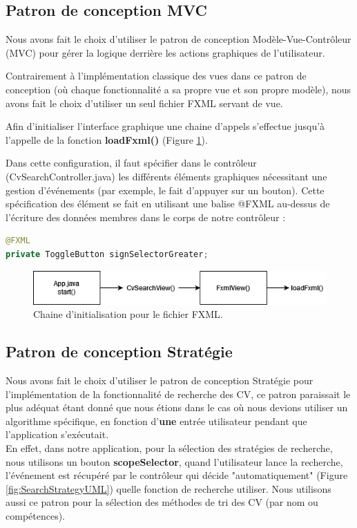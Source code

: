 \documentclass{article}
\begin{document}
\subsection{Patron de conception \textbf{MVC}}
Nous avons fait le choix d'utiliser le patron de conception Modèle-Vue-Contrôleur (MVC) pour gérer la logique derrière les actions graphiques de l'utilisateur.

Contrairement à l'implémentation classique des vues dans ce patron de conception (où chaque fonctionnalité a sa propre vue et son propre modèle), nous avons fait le choix d'utiliser un seul fichier FXML servant de vue.

Afin d'initialiser l'interface graphique une chaine d'appels s'effectue jusqu'à l'appelle de la fonction \textbf{loadFxml()} (Figure \ref{fig:loadFXML_chain}).

Dans cette configuration, il faut spécifier dans le contrôleur (CvSearchController.java) les différents éléments graphiques nécessitant une gestion d'événements (par exemple, le fait d'appuyer sur un bouton). Cette spécification des élément se fait en utilisant une balise @FXML au-dessus de l'écriture des données membres dans le corps de notre contrôleur :
\begin{lstlisting}[language=java]
@FXML
private ToggleButton signSelectorGreater;
\end{lstlisting}


\begin{figure}[!tbp]
\centering
\begin{minipage}[b]{1\textwidth}
    \includegraphics[width=\textwidth]{FXMLLoader.png}
    \caption{\label{fig:loadFXML_chain}Chaine d'initialisation pour le fichier FXML.}
\end{minipage}
\end{figure}



\subsection{Patron de conception Stratégie}
Nous avons fait le choix d'utiliser le patron de conception Stratégie pour l'implémentation de la fonctionnalité de recherche des CV, ce patron paraissait le plus adéquat étant donné que nous étions dans le cas où nous devions utiliser un algorithme spécifique, en fonction d'\textbf{une} entrée utilisateur pendant que l'application s'exécutait. \\
En effet, dans notre application, pour la sélection des stratégies de recherche, nous utilisons un bouton \textbf{scopeSelector}, quand l'utilisateur lance la recherche, l'événement est récupéré par le contrôleur qui décide "automatiquement" (Figure \ref{fig:SearchStrategyUML}) quelle fonction de recherche utiliser.
Nous utilisons aussi ce patron pour la sélection des méthodes de tri des CV (par nom ou compétences).
\end{document}

